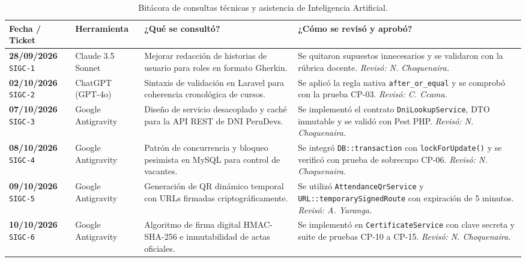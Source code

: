 \begin{table}[H]
\centering
\small
\begin{tabularx}{\textwidth}{P{2.2cm} P{2.6cm} P{4.2cm} Y}
\toprule
\textbf{Fecha / Ticket} & \textbf{Herramienta} & \textbf{¿Qué se consultó?} & \textbf{¿Cómo se revisó y aprobó?} \\
\midrule
\textbf{28/09/2026} \newline \texttt{SIGC-1} & Claude 3.5 Sonnet & Mejorar redacción de historias de usuario para roles en formato Gherkin. & Se quitaron supuestos innecesarios y se validaron con la rúbrica docente. \textit{Revisó: N. Choquenaira.} \\
\addlinespace
\textbf{02/10/2026} \newline \texttt{SIGC-2} & ChatGPT (GPT-4o) & Sintaxis de validación en Laravel para coherencia cronológica de cursos. & Se aplicó la regla nativa \texttt{after\_or\_equal} y se comprobó con la prueba CP-03. \textit{Revisó: C. Ccama.} \\
\addlinespace
\textbf{07/10/2026} \newline \texttt{SIGC-3} & Google Antigravity & Diseño de servicio desacoplado y caché para la API REST de DNI PeruDevs. & Se implementó el contrato \texttt{DniLookupService}, DTO inmutable y se validó con Pest PHP. \textit{Revisó: N. Choquenaira.} \\
\addlinespace
\textbf{08/10/2026} \newline \texttt{SIGC-4} & Google Antigravity & Patrón de concurrencia y bloqueo pesimista en MySQL para control de vacantes. & Se integró \texttt{DB::transaction} con \texttt{lockForUpdate()} y se verificó con prueba de sobrecupo CP-06. \textit{Revisó: N. Choquenaira.} \\
\addlinespace
\textbf{09/10/2026} \newline \texttt{SIGC-5} & Google Antigravity & Generación de QR dinámico temporal con URLs firmadas criptográficamente. & Se utilizó \texttt{AttendanceQrService} y \texttt{URL::temporarySignedRoute} con expiración de 5 minutos. \textit{Revisó: A. Yaranga.} \\
\addlinespace
\textbf{10/10/2026} \newline \texttt{SIGC-6} & Google Antigravity & Algoritmo de firma digital HMAC-SHA-256 e inmutabilidad de actas oficiales. & Se implementó en \texttt{CertificateService} con clave secreta y suite de pruebas CP-10 a CP-15. \textit{Revisó: N. Choquenaira.} \\
\bottomrule
\end{tabularx}
\caption{Bitácora de consultas técnicas y asistencia de Inteligencia Artificial.}
\label{tab:registro_ia}
\end{table}
